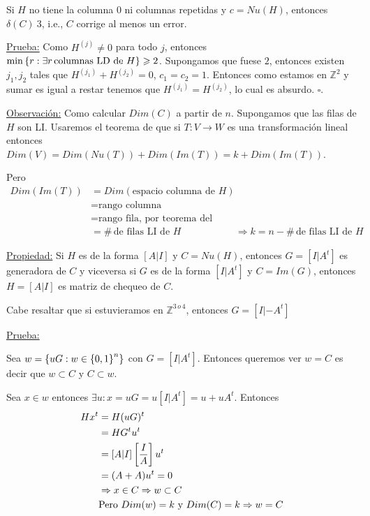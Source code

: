 \documentclass[12pt,a4paper]{article}
\begin{document}
\begin{corolario} Si $H$ no tiene la columna $0$ ni columnas repetidas y 
    $c = Nu(H)$, entonces $\delta(C) \> 3$, i.e., $C$ corrige al menos un error.
\end{corolario}

\underline{Prueba:} Como $H^{(j)} \neq 0$ para todo $j$, entonces 
$\min \left\lbrace r: \exists r\,\text{columnas LD de $H$} \right\rbrace \geqslant 2$. Supongamos que 
fuese $2$, entonces existen $j_{1},j_{2}$ tales que $H^{(j_{1})} + H^{(j_{2})} = 0$,
$c_{1} = c_{2}=1$. Entonces como estamos en $\mathbb{Z}^{2}$ y sumar es igual a restar 
tenemos que $H^{(j_{1})} = H^{(j_{2})}$, lo cual es absurdo. $\square$.
\medskip

\underline{Observación:} Como calcular $Dim(C)$ a partir de $n$. Supongamos que 
las filas de $H$ son LI. Usaremos el teorema de que si $T: V\to W$ es una transformación 
lineal entonces $Dim(V) = Dim(Nu(T)) + Dim(Im(T)) = k + Dim(Im(T))$.
\medskip

Pero 
\begin{align*}
    Dim(Im(T)) &= Dim(\text{espacio columna de $H$})\\
    &= \text{rango columna}\\
    &= \text{rango fila, por teorema del rango}\\
    &= \# \,\text{de filas LI de $H$}
    &\Rightarrow k = n - \# \,\text{de filas LI de $H$}
\end{align*}

\underline{Propiedad:} Si $H$ es de la forma $[A|I]$ y $C=Nu(H)$, entonces 
$G=[I|A^{t}]$ es generadora de $C$ y viceversa si $G$ es de la forma $[I|A^{t}]$ 
y $C=Im(G)$, entonces $H=[A|I]$ es matriz de chequeo de $C$.
\medskip

Cabe resaltar que si estuvieramos en $\mathbb{Z}^{3\,o\,4}$, entonces $G=[I|-A^{t}]$
\medskip

\underline{Prueba:}
\medskip

Sea $w = \left\lbrace uG:w\in \left\lbrace 0,1 \right\rbrace^{n} \right\rbrace$ con $G=[I|A^{t}]$. Entonces queremos ver 
$w = C$ es decir que $w\subset C$ y $C\subset w$.
\medskip

Sea $x\in w$ entonces $\exists u: x=uG = u[I|A^{t}] = u + uA^{t}$. Entonces
\begin{align*}
    Hx^{t} &= H(uG)^{t} \\
    &= HG^{t}u^{t}\\
    &=[A|I]\left[\frac{I}{A}\right] u^{t}\\
    &= (A+A)u^{t} = 0\\
    &\Rightarrow x\in C \Rightarrow w\subset C\\
    &\text{Pero $Dim(w)=k$ y $Dim(C)=k$} \Rightarrow w=C\\
\end{align*}
\end{document}
